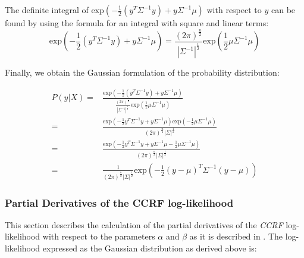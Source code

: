 The definite integral of $\text{exp}(- \frac{1}{2}(y^T\Sigma^{-1}y)+y\Sigma^{-1}\mu)$ with respect to $y$ can be found by using the formula for an integral with square and linear terms:
\begin{equation}
\text{exp}(- \frac{1}{2}(y^T\Sigma^{-1}y)+y\Sigma^{-1}\mu) = \frac{(2\pi)^{\frac{n}{2}}}{|\Sigma^{-1}|^{\frac{1}{2}}}\text{exp}(\frac{1}{2}\mu \Sigma^{-1} \mu)
\end{equation}

Finally, we obtain the Gaussian formulation of the probability distribution:

\begin{equation}
\begin{split}
P(y|X) = & \frac{\text{exp}(- \frac{1}{2}(y^T\Sigma^{-1}y)+y\Sigma^{-1}\mu)}{\frac{(2\pi)^{\frac{n}{2}}}{|\Sigma^{-1}|^{\frac{1}{2}}}\text{exp}(\frac{1}{2}\mu \Sigma^{-1} \mu)}\\
 = & \frac{\text{exp}( - \frac{1}{2} y^T \Sigma^{-1} y + y\Sigma^{-1}\mu )\text{exp} (-\frac{1}{2}\mu\Sigma^{-1}\mu) }{ (2\pi)^{\frac{n}{2}} |\Sigma|^{\frac{1}{2}} } \\
 = & \frac{\text{exp}(-\frac{1}{2} y^T \Sigma^{-1} y + y \Sigma^{-1} \mu - \frac{1}{2} \mu \Sigma^{-1} \mu)   }{  (2\pi)^{\frac{n}{2}} |\Sigma|^{\frac{1}{2}} } \\
 = & \frac{1}{   (2\pi)^{\frac{n}{2}} |\Sigma|^{\frac{1}{2}} }\text{exp}(-\frac{1}{2} (y-\mu)^T \Sigma^{-1} (y-\mu))
\end{split}
\end{equation}

\subsubsection{Partial Derivatives of the CCRF log-likelihood}

This section describes the calculation of the partial derivatives of the \textit{CCRF} log-likelihood with respect to the parameters $\alpha$ and $\beta$ as it is described in \cite{baltruvsaitis2013dimensional}.
The log-likelihood expressed as the Gaussian distribution as derived above is:

